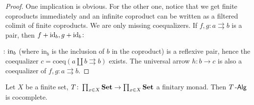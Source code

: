 \documentclass[a4paper,11pt,oneside,openany]{scrbook}
\begin{document}
\begin{proof}
	One implication is obvious. For the other one, notice that we get finite
    coproducts immediately and an infinite coproduct can be written as a
    filtered colimit of finite coproducts. We are only missing coequalizers. If
    $f,g\colon a\rightrightarrows b$ is a pair, then
    $f+\operatorname{id}_b,g+\operatorname{id}_b\colon\hspace{-1.5mm}$$\hspace{-1.5mm}\colon\text{in}_b$ (where in$_b$ is the
	inclusion of $b$ in the coproduct) is a reflexive pair, hence the
	coequalizer $c=\text{coeq}(a\coprod b\rightrightarrows b)$ exists.
	The universal arrow $h\colon b\rightarrow c$ is also a
	coequalizer of $f,g\colon a\rightrightarrows b$.
\end{proof}
\begin{thm}
	Let $X$ be a finite set, $T\colon\prod_{x\in X}{\normalfont\textbf{Set}}\to\prod_{x\in X}{\normalfont\textbf{Set}}$ a finitary monad. Then $T\operatorname{-\mathsf{Alg}}$ is cocomplete.
\end{thm}
\end{document}
